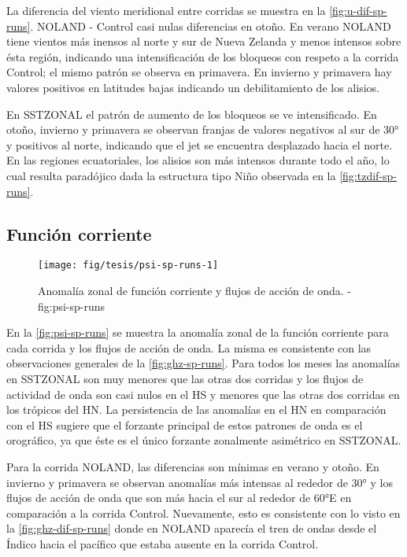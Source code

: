 \documentclass[spanish,a4paper,12p]{book}
\begin{document}
La diferencia del viento meridional entre corridas se muestra en la
\autoref{fig:u-dif-sp-runs}. NOLAND - Control casi nulas diferencias en
otoño. En verano NOLAND tiene vientos más inensos al norte y sur de
Nueva Zelanda y menos intensos sobre ésta región, indicando una
intensificación de los bloqueos con respeto a la corrida Control; el
mismo patrón se observa en primavera. En invierno y primavera hay
valores positivos en latitudes bajas indicando un debilitamiento de los
alisios.

En SSTZONAL el patrón de aumento de los bloqueos se ve intensificado. En
otoño, invierno y primavera se observan franjas de valores negativos al
sur de 30° y positivos al norte, indicando que el jet se encuentra
desplazado hacia el norte. En las regiones ecuatoriales, los alisios son
más intensos durante todo el año, lo cual resulta paradójico dada la
estructura tipo Niño observada en la \autoref{fig:tzdif-sp-runs}.

\subsection{Función corriente}\label{funcion-corriente-3}

\begin{landscape}\begin{figure}

{\centering \texttt{[image: fig/tesis/psi-sp-runs-1]} 

}

\caption{Anomalía zonal de función corriente y flujos de acción de onda. - fig:psi-sp-runs}\label{fig:psi-sp-runs}
\end{figure}
\end{landscape}

En la \autoref{fig:psi-sp-runs} se muestra la anomalía zonal de la
función corriente para cada corrida y los flujos de acción de onda. La
misma es consistente con las observaciones generales de la
\autoref{fig:ghz-sp-runs}. Para todos los meses las anomalías en
SSTZONAL son muy menores que las otras dos corridas y los flujos de
actividad de onda son casi nulos en el HS y menores que las otras dos
corridas en los trópicos del HN. La persistencia de las anomalías en el
HN en comparación con el HS sugiere que el forzante principal de estos
patrones de onda es el orográfico, ya que éste es el único forzante
zonalmente asimétrico en SSTZONAL.

Para la corrida NOLAND, las diferencias son mínimas en verano y otoño.
En invierno y primavera se observan anomalías más intensas al rededor de
30° y los flujos de acción de onda que son más hacia el sur al rededor
de 60°E en comparación a la corrida Control. Nuevamente, esto es
consistente con lo visto en la \autoref{fig:ghz-dif-sp-runs} donde en
NOLAND aparecía el tren de ondas desde el Índico hacia el pacífico que
estaba ausente en la corrida Control.
\end{document}
